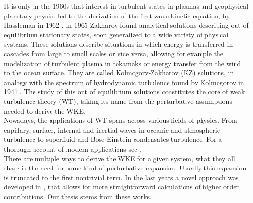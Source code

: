     It is only in the 1960s that interest in turbulent states in plasmas and geophysical planetary physics led to the derivation of the first wave kinetic equation, by Hassleman in 1962 \cite{Hasselmann1962}. In 1965 Zakharov \cite{Zakharov1965} found analytical solutions describing out of equilibrium stationary states, soon generalized to a wide variety of physical systems. These solutions describe situations in which energy is transferred in cascades from large to small scales or vice versa, allowing for example the modelization of  turbulent plasma in tokamaks or energy transfer from the wind to the ocean surface. They are called Kolmogorv-Zakharov (KZ) solutions, in analogy with the spectrum of hydrodynamic turbulence found by Kolmogorov in 1941 \cite{1991}. The study of this out of equilibrium solutions constitutes the core of weak turbulence theory (WT), taking its name from the perturbative assumptions needed to derive the WKE. \\ 
    Nowadays, the applications of WT spans across various fields of physics. From capillary, surface, internal and inertial waves in oceanic and atmospheric turbulence to superfluid and Bose-Einstein condensates turbulence. For a thorough account of modern applications see \cite{Nazarenko2011}.\\ 
    There are multiple ways to derive the WKE for a given system, what they all share is the need for some kind of perturbative expansion. Usually this expansion is truncated to the first nontrivial term. In the last years a novel approach was developed in \cite{Rosenhaus:2022uwa} \cite{Rosenhaus:2023pdj} \cite{Rosenhaus:2023sik} \cite{Rosenhaus2023}, that allows for more straightforward calculations of higher order contributions. Our thesis stems from these works. \\

